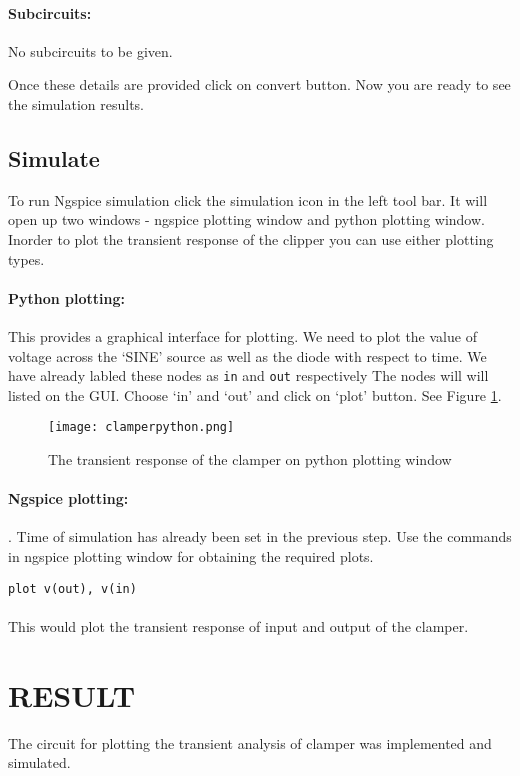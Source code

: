 \paragraph{Subcircuits:} No subcircuits to be given.

\noindent Once these details are provided click on convert button.  Now you are ready to see the simulation results.


\paragraph{}
\subsection*{Simulate} To run Ngspice simulation click the simulation icon in the left tool bar. It will open up two windows - ngspice plotting window and python plotting window. Inorder to plot the transient response of the clipper you can use either plotting types.

\paragraph{Python plotting:}This provides a graphical interface for plotting. We need to plot the value of voltage across the `SINE' source as well as the diode with respect to time. We have already labled these nodes as \texttt{in} and \texttt{out} respectively The nodes will will listed on the GUI. Choose  `in' and `out' and click on `plot' button. See Figure \ref{clamperpython}.

\begin{figure}[h]
\centering
\texttt{[image: clamperpython.png]}
\caption{The transient response of the clamper on python plotting window}
\label{clamperpython}
\end{figure}

\paragraph{Ngspice plotting:}. Time of simulation has already been set in the previous step. Use the commands in ngspice plotting window for obtaining the required plots.

\texttt{plot v(out), v(in) }

\paragraph{}

This would plot the transient response of input and output of the clamper. 


\section*{RESULT}
The circuit for plotting the transient analysis of clamper was implemented and simulated.


